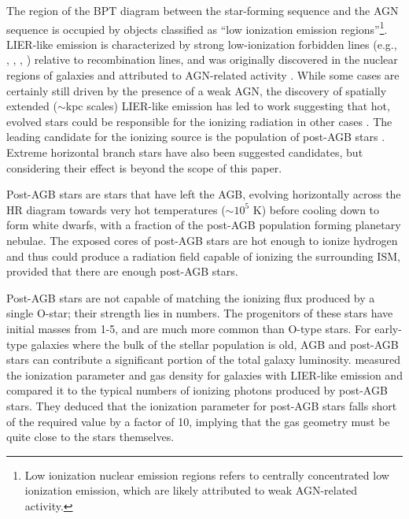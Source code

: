 The region of the BPT diagram between the star-forming sequence and the AGN sequence is occupied by objects classified as ``low ionization emission regions''\citep[LIERs, ][]{Belfiore16}\footnote{Low ionization nuclear emission regions \citep[LINERs, ][]{Heckman1980} refers to centrally concentrated low ionization emission, which are likely attributed to weak AGN-related activity.}. LIER-like emission is characterized by strong low-ionization forbidden lines (e.g., \nii{}, \sii{}, \oii{}, \oi{}) relative to recombination lines, and was originally discovered in the nuclear regions of galaxies and attributed to AGN-related activity \citep{Kauffmann03b, Kewley06, Ho08}. While some cases are certainly still driven by the presence of a weak AGN, the discovery of spatially extended (${\sim}$kpc scales) LIER-like emission has led to work suggesting that hot, evolved stars could be responsible for the ionizing radiation in other cases \citep{Singh13, Belfiore16}. The leading candidate for the ionizing source is the population of post-AGB stars \citep{Binette94, Sarzi10, Yan12}. Extreme horizontal branch stars have also been suggested candidates, but considering their effect is beyond the scope of this paper.

Post-AGB stars are stars that have left the AGB, evolving horizontally across the HR diagram towards very hot temperatures ($\sim10^5$ K) before cooling down to form white dwarfs, with a fraction of the post-AGB population forming planetary nebulae. The exposed cores of post-AGB stars are hot enough to ionize hydrogen and thus could produce a radiation field capable of ionizing the surrounding ISM, provided that there are enough post-AGB stars. 

Post-AGB stars are not capable of matching the ionizing flux produced by a single O-star; their strength lies in numbers. The progenitors of these stars have initial masses from 1-5\Msun{}, and are much more common than O-type stars. For early-type galaxies where the bulk of the stellar population is old, AGB and post-AGB stars can contribute a significant portion of the total galaxy luminosity. \citet{Yan12} measured the ionization parameter and gas density for galaxies with LIER-like emission and compared it to the typical numbers of ionizing photons produced by post-AGB stars. They deduced that the ionization parameter for post-AGB stars falls short of the required value by a factor of 10, implying that the gas geometry must be quite close to the stars themselves.

